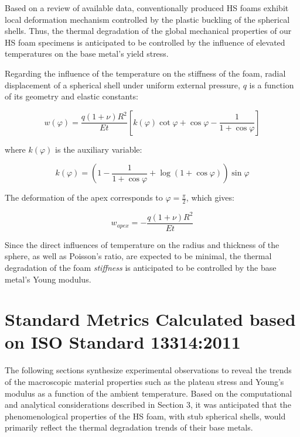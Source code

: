 \documentclass[review]{elsarticle}
\begin{document}
Based on a review of available data, conventionally produced HS foams exhibit local deformation mechanism controlled by the plastic buckling of the spherical shells. Thus, the thermal degradation of the global mechanical properties of our HS foam specimens is anticipated to be controlled by the influence of elevated temperatures on the base metal’s yield stress.

Regarding the influence of the temperature on the stiffness of the foam, radial displacement of a spherical shell under uniform external pressure, $q$ is a function of its geometry and elastic constants:

\begin{equation}\label{Eq6}
w(\varphi)=\frac{q(1+\nu)R^2}{Et}\left [ k(\varphi)\cot\varphi+\cos \varphi- \frac{1}{1+\cos\varphi} \right ]
\end{equation}

where $k(\varphi)$ is the auxiliary variable:

\begin{equation}\label{Eq7}
k(\varphi)=\left ( 1- \frac{1}{1+\cos\varphi} + \log(1+\cos\varphi) \right ) \sin \varphi
\end{equation}

The deformation of the apex corresponds to $\varphi=\frac{\pi}{2}$, which gives:

\begin{equation}\label{Eq8}
w_{apex}=-\frac{q(1+\nu)R^2}{Et}
\end{equation}

Since the direct influences of temperature on the radius and thickness of the sphere, as well as Poisson’s ratio, are expected to be minimal, the thermal degradation of the foam \emph{stiffness} is anticipated to be controlled by the base metal’s Young modulus.

\section{Standard Metrics Calculated based on ISO Standard 13314:2011}

The following sections synthesize experimental observations to reveal the trends of the macroscopic material properties such as the plateau stress and Young’s modulus as a function of the ambient temperature. Based on the computational and analytical considerations described in Section 3, it was anticipated that the phenomenological properties of the HS foam, with stub spherical shells, would primarily reflect the thermal degradation trends of their base metals.
\end{document}
